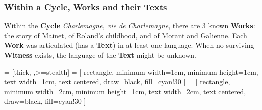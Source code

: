     \begin{frame}
    \frametitle{Within a Cycle, Works and their Texts}
    
    Within the \textbf{Cycle} \textit{Charlemagne, vie de Charlemagne}, there are 3 known \textbf{Works}:
    the story of Mainet, of Roland's childhood, and of Morant and Galienne.
    Each \textbf{Work} was articulated (has a \textbf{Text}) in at least one language.
    When no surviving \textbf{Witness} exists, the language of the \textbf{Text} might be unknown.
    
    \tiny
    
     = [thick,-,>=stealth]
     = [
        rectangle,
        minimum width=1cm,
        minimum height=1cm,
        text width=1cm,
        text centered,
        draw=black,
        fill=cyan!30
    ]
     = [
        rectangle,
        minimum width=2cm,
        minimum height=1cm,
        text width=2cm,
        text centered,
        draw=black,
        fill=cyan!30
    ]
    
        \begin{center}
\end{center}
\end{frame}
